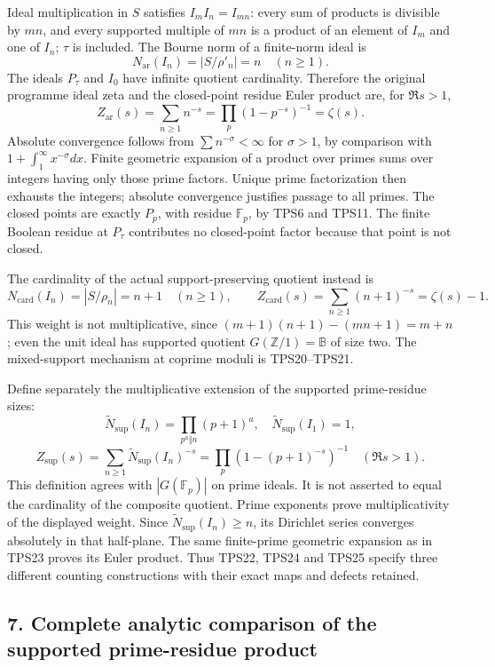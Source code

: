 \documentclass[
  10pt,
]{article}
\begin{document}
Ideal multiplication in \(S\) satisfies \(I_mI_n=I_{mn}\): every sum of
products is divisible by \(mn\), and every supported multiple of \(mn\)
is a product of an element of \(I_m\) and one of \(I_n\); \(\tau\) is
included. The Bourne norm of a finite-norm ideal is \[
N_{\mathrm{ar}}(I_n)=|S/\rho'_n|=n\quad(n\ge1).
\tag{TPS22}
\] The ideals \(P_\tau\) and \(I_0\) have infinite quotient cardinality.
Therefore the original programme ideal zeta and the closed-point residue
Euler product are, for \(\Re s>1\), \[
Z_{\mathrm{ar}}(s)=\sum_{n\ge1}n^{-s}
=\prod_p(1-p^{-s})^{-1}=\zeta(s).
\tag{TPS23}
\] Absolute convergence follows from \(\sum n^{-\sigma}<\infty\) for
\(\sigma>1\), by comparison with \(1+\int_1^\infty x^{-\sigma}dx\).
Finite geometric expansion of a product over primes sums over integers
having only those prime factors. Unique prime factorization then
exhausts the integers; absolute convergence justifies passage to all
primes. The closed points are exactly \(P_p\), with residue
\(\mathbb F_p\), by TPS6 and TPS11. The finite Boolean residue at
\(P_\tau\) contributes no closed-point factor because that point is not
closed.

The cardinality of the actual support-preserving quotient instead is \[
N_{\mathrm{card}}(I_n)=|S/\rho_n|=n+1\quad(n\ge1),
\qquad
Z_{\mathrm{card}}(s)=\sum_{n\ge1}(n+1)^{-s}=\zeta(s)-1.
\tag{TPS24}
\] This weight is not multiplicative, since \((m+1)(n+1)-(mn+1)=m+n\);
even the unit ideal has supported quotient \(G(\mathbb Z/1)=\mathbb B\)
of size two. The mixed-support mechanism at coprime moduli is
TPS20--TPS21.

Define separately the multiplicative extension of the supported
prime-residue sizes: \[
\widetilde N_{\mathrm{sup}}(I_n)=\prod_{p^a\Vert n}(p+1)^a,
\quad \widetilde N_{\mathrm{sup}}(I_1)=1,
\] \[
\boxed{Z_{\mathrm{sup}}(s)=\sum_{n\ge1}\widetilde N_{\mathrm{sup}}(I_n)^{-s}
=\prod_p(1-(p+1)^{-s})^{-1}\quad(\Re s>1).}
\tag{TPS25}
\] This definition agrees with \(|G(\mathbb F_p)|\) on prime ideals. It
is not asserted to equal the cardinality of the composite quotient.
Prime exponents prove multiplicativity of the displayed weight. Since
\(\widetilde N_{\mathrm{sup}}(I_n)\ge n\), its Dirichlet series
converges absolutely in that half-plane. The same finite-prime geometric
expansion as in TPS23 proves its Euler product. Thus TPS22, TPS24 and
TPS25 specify three different counting constructions with their exact
maps and defects retained.

\subsection{7. Complete analytic comparison of the supported
prime-residue
product}\label{complete-analytic-comparison-of-the-supported-prime-residue-product}
\end{document}
